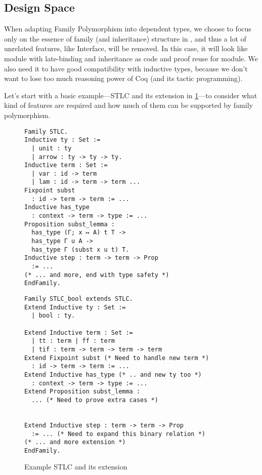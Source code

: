 \subsection{Design Space}

When adapting Family Polymorphism into dependent types, we choose to
focus only on the essence of family (and inheritance)
structure in \citet{zm2017}, and thus a lot of unrelated features, like
Interface, will be removed. In this case, it will look like module with
late-binding and inheritance as code and proof reuse for module. We also
need it to have good compatibility with inductive types, because we
don't want to lose too much reasoning power of Coq (and its tactic
programming). 

Let's start with a basic example---STLC and its extension in
\cref{fig:STLC-example}---to consider what kind of features are required
and how much of them can be supported by family polymorphism.

\begin{figure}[!htb]
  \begin{minipage}[t]{0.47\linewidth}
\begin{verbatim}
Family STLC.
Inductive ty : Set :=
  | unit : ty
  | arrow : ty -> ty -> ty.
Inductive term : Set := 
  | var : id -> term 
  | lam : id -> term -> term ...
Fixpoint subst 
  : id -> term -> term := ...
Inductive has_type 
  : context -> term -> type := ...
Proposition subst_lemma :
  has_type (Γ; x ↦ A) t T ->
  has_type Γ u A ->
  has_type Γ (subst x u t) T.
Inductive step : term -> term -> Prop 
  := ...
(* ... and more, end with type safety *)
EndFamily.
\end{verbatim}
  \end{minipage}
  \begin{minipage}[t]{0.47\linewidth}
\begin{verbatim}
Family STLC_bool extends STLC.
Extend Inductive ty : Set :=
  | bool : ty.

Extend Inductive term : Set := 
  | tt : term | ff : term 
  | tif : term -> term -> term -> term
Extend Fixpoint subst (* Need to handle new term *)
  : id -> term -> term := ...
Extend Inductive has_type (* .. and new ty too *)
  : context -> term -> type := ...
Extend Proposition subst_lemma :
  ... (* Need to prove extra cases *)


Extend Inductive step : term -> term -> Prop 
  := ... (* Need to expand this binary relation *)
(* ... and more extension *)
EndFamily.
\end{verbatim}
  \end{minipage}
  \caption{Example STLC and its extension}\label{fig:STLC-example}
\end{figure}


